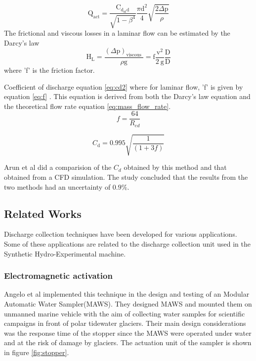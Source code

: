 \begin{equation}
\mathrm{Q}_{\mathrm{act}}=\frac{\mathrm{C}_{\mathrm{d}_{\mathrm{st}} \mathrm{d}}}{\sqrt{1-\beta^{4}}} \frac{\pi \mathrm{d}^{2}}{4} \sqrt{\frac{2 \Delta \mathrm{p}}{\rho}}
\end{equation}
The frictional and viscous losses in a laminar flow can be estimated by the Darcy's law
\begin{equation}
\mathrm{H}_{\mathrm{L}}=\frac{(\Delta \mathrm{p})_{\text {viscous }}}{\rho \mathrm{g}}=\mathrm{f} \frac{\mathrm{v}^{2}}{2 \mathrm{~g}} \frac{\mathrm{D}}{\mathrm{D}}
\end{equation}
where 'f' is the friction factor.
\par
Coefficient of discharge equation \ref{eq:cd2} where for laminar flow, 'f' is given by equation \ref{eq:f} . This equation is derived from both the Darcy's law equation and the theoretical flow rate equation \ref{eq:mass_flow_rate}.
\begin{equation}
f=\frac{64}{R_{e d}}
\label{eq:f}
\end{equation}


\begin{equation}
C_{\mathrm{d}}=0.995 \sqrt{\frac{1}{(1+3 f)}}
\label{eq:cd2}
\end{equation}

\par
Arun et al \cite{arun2015prediction} did  a comparision of the $C_{d}$ obtained by this method and that obtained from a CFD simulation. The study concluded that the results from the two methods had an uncertainty of $0.9\%$.
\subsection{Related Works}
Discharge collection techniques have been developed for various applications. Some of these applications are related to the discharge collection unit used in the Synthetic Hydro-Experimental machine.

\subsubsection{Electromagnetic activation}
Angelo et al \cite{odetti2019design} implemented this technique in the design and testing of an Modular Automatic Water Sampler(MAWS). They designed MAWS and mounted them on unmanned marine vehicle with the aim of collecting water samples for scientific campaigns in front of polar tidewater glaciers. Their main design considerations was the response time of the stopper since the MAWS were operated under water and at the risk of damage by glaciers. The actuation unit of the sampler is shown in figure \ref{fig:stopper}. 

